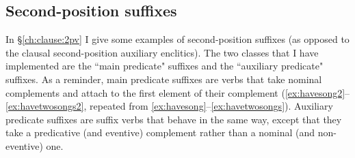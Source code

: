 \begin{comment}
That is, the attribute-value matrix (AVM) for the full predicate complex \textit{=ʔaqƛ=s} in (\ref{ex:2padvpred}) should look something like this:

\ex \label{ex:2pmodavm}
\begin{avm}
\[\asort{clausal-inflection}
   head.pred & + \\
   comp & \< \[ \textsc{head} & +mod \\
 	               mod & \< \[ head.pred & + \\
 	                                    subj & 1sg \\
 	                                    e.tense & future \] \> \] \> \]
\end{avm}
\xe




\ex \label{ex:2pmodrule}
\begin{avm}
\[\asort{clausal-inflection-mod}
 \textsc{head.pred} & + \\
   subj & \avmbox{1} \\
   \textsc{comp} & \< \[ \textsc{head} & +mod \\
 	               \textsc{mod} & \< \[ \textsc{head.pred} & + \\
 	                                    \textsc{subj} & \avmbox{1} \\
 	                                    \textsc{comp} & \avmbox{2} \] \> \] \> $\oplus$ \avmbox{2} \\
   \textsc{dtr} & \textit{clausal-inflection} \]
\end{avm}
\xe
\end{comment}

\subsection{Second-position suffixes} \label{ch:clause:analysis:2pv}

In \S\ref{ch:clause:2pv} I give some examples of second-position suffixes (as opposed to the clausal second-position auxiliary enclitics). The two classes that I have implemented are the ``main predicate" suffixes and the ``auxiliary predicate" suffixes. As a reminder, main predicate suffixes are verbs that take nominal complements and attach to the first element of their complement (\ref{ex:havesong2}--\ref{ex:havetwosongs2}, repeated from \ref{ex:havesong}--\ref{ex:havetwosongs}). Auxiliary predicate suffixes are suffix verbs that behave in the same way, except that they take a predicative (and eventive) complement rather than a nominal (and non-eventive) one.

